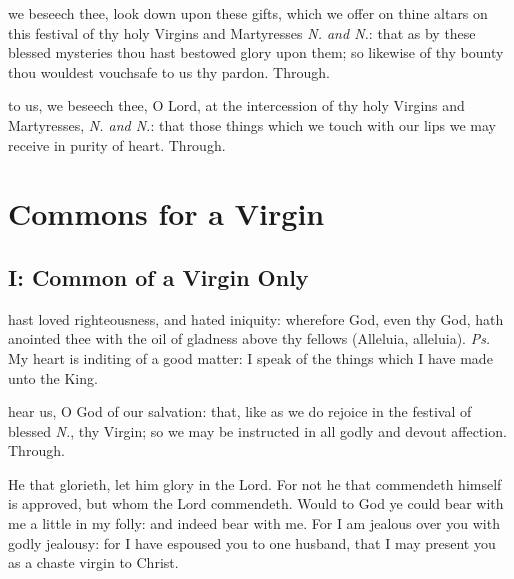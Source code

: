 \vspace{-0.1\baselineskip}

 we beseech thee, look down upon these gifts, which we offer on thine altars on this festival of thy holy Virgins and Martyresses \textit{N. and N.}: that as by these blessed mysteries thou hast bestowed glory upon them; so likewise of thy bounty thou wouldest vouchsafe to us thy pardon. Through.

\postcommunion
{} to us, we beseech thee, O Lord, at the intercession of thy holy Virgins and Martyresses, \textit{N. and N.}: that those things which we touch with our lips we may receive in purity of heart. Through.


\section{Commons for a Virgin}

\subsection{I: Common of a Virgin Only}\label{CommonVirginOnlyI}

\introit
{} hast loved righteousness, and hated iniquity: wherefore God, even thy God, hath anointed thee with the oil of gladness above thy fellows (Alleluia, alleluia). \textit{Ps.} My heart is inditing of a good matter: I speak of the things which I have made unto the King.

\collect\label{CommonVirginOnlyICollect}
 hear us, O God of our salvation: that, like as we do rejoice in the festival of blessed \textit{N.}, thy Virgin; so we may be instructed in all godly and devout affection. Through.

\label{CommonVirginOnlyIEpistle}
 He that glorieth, let him glory in the Lord. For not he that commendeth himself is approved, but whom the Lord commendeth. Would to God ye could bear with me a little in my folly: and indeed bear with me. For I am jealous over you with godly jealousy: for I have espoused you to one husband, that I may present you as a chaste virgin to Christ.


